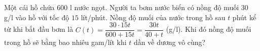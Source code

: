 \begin{ex}
Một cái hồ chứa $600$ l nước ngọt. Người ta bơm nước biển có nồng độ muối $30$ g/l vào hồ với tốc độ $15$ lít/phút. Nồng độ muối của nước trong hồ sau $t$ phút kể từ khi bắt đầu bơm là $C(t)=\dfrac{30\cdot15t}{600+15t}=\dfrac{30t}{40+t}$ (g/l). Khi đó nồng độ muối trong hồ sẽ bằng bao nhiêu gam/lít khi $t$ dần về dương vô cùng?
\end{ex}

